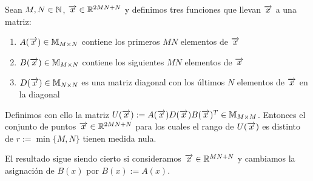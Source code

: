 \begin{lema}

    Sean $M, N \in \mathbb{N}$, $\overrightarrow{x} \in \mathbb{R}^{2MN + N}$ y definimos tres funciones que llevan $\overrightarrow{x}$ a una matriz:

    \begin{enumerate}
        \item $A(\overrightarrow{x}) \in \mathbb{M}_{M \times N}$ contiene los primeros $MN$ elementos de $\overrightarrow{x}$
        \item $B(\overrightarrow{x}) \in \mathbb{M}_{M \times N}$ contiene los siguientes $MN$ elementos de $\overrightarrow{x}$
        \item $D(\overrightarrow{x}) \in \mathbb{M}_{N \times N}$ es una matriz diagonal con los últimos $N$ elementos de $\overrightarrow{x}$ en la diagonal
    \end{enumerate}

    Definimos con ello la matriz $U(\overrightarrow{x}) := A(\overrightarrow{x}) D(\overrightarrow{x}) B(\overrightarrow{x})^T \in \mathbb{M}_{M \times M}$. Entonces el conjunto de puntos $\overrightarrow{x} \in \mathbb{R}^{2MN + N}$ para los cuales el rango de $U(\overrightarrow{x})$ es distinto de $r := \min \{M, N\}$ tienen medida nula.

    El resultado sigue siendo cierto si consideramos $\overrightarrow{x} \in \mathbb{R}^{MN+N}$ y cambiamos la asignación de $B(x)$ por $B(x) := A(x)$.
\end{lema}

